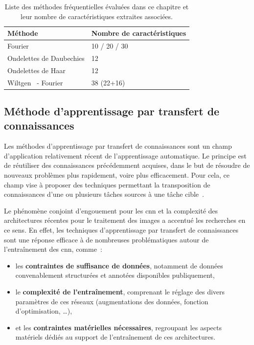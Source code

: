 \begin{table}[H]
    \centering
    \begin{tabular}{ll}
        \toprule
        \textbf{Méthode}                        & \textbf{Nombre de caractéristiques}   \\ \hline
        Fourier                                 & 10 / 20 / 30                          \\ \hline
        Ondelettes de Daubechies                & 12                                    \\ \hline
        Ondelettes de Haar                      & 12                                    \\ \hline
        Wiltgen~\cite{Wiltgen2008} - Fourier    & 38 (22+16)                             \\
        \bottomrule
    \end{tabular}
    \caption{Liste des méthodes fréquentielles évaluées dans ce chapitre et leur nombre de caractéristiques extraites associées.}
    \label{tab:number_features_frequency}
\end{table}\par
\clearpage

\subsection{Méthode d'apprentissage par transfert de connaissances}
Les méthodes d'apprentissage par transfert de connaissances sont un champ d'application relativement récent de l'apprentissage automatique. Le principe est de réutiliser des connaissances précédemment acquises, dans le but de résoudre de nouveaux problèmes plus rapidement, voire plus efficacement. Pour cela, ce champ vise à proposer des techniques permettant la transposition de connaissances d'une ou plusieurs tâches sources à une tâche cible~\cite{QiangYang2010}.\par

Le phénomène conjoint d'engouement pour les \gls{cnn} et la complexité des architectures récentes pour le traitement des images a accentué les recherches en ce sens. En effet, les techniques d'apprentissage par transfert de connaissances sont une réponse efficace à de nombreuses problématiques autour de l'entraînement des \gls{cnn}, comme~: 
\begin{itemize}
    \item les \textbf{contraintes de suffisance de données}, notamment de données convenablement structurées et annotées disponibles publiquement,
    \item le \textbf{complexité de l'entraînement}, comprenant le réglage des divers paramètres de ces réseaux (augmentations des données, fonction d'optimisation, \ldots),
    \item et les \textbf{contraintes matérielles nécessaires}, regroupant les aspects matériels dédiés au support de l'entraînement de ces architectures.
\end{itemize}\par

